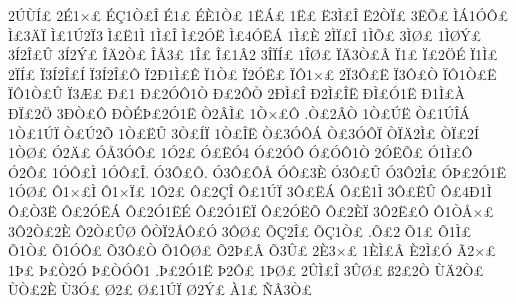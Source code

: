 {2^^da^^d9^^cd^^a3
2^^c91^^d7^^a3
^^c9^^c71^^d2^^a3^^ce
^^c91^^a3
^^c9^^c81^^d2^^a3
1^^cb^^c1^^a3
1^^cb^^a3
^^cb3^^cc^^a3^^ce
^^cb2^^d2^^cf^^a3
3^^cb^^d5^^a3
^^cc^^c11^^d3^^d4^^a3
^^cc^^a33^^c4^^cf
^^cc^^a31^^da2^^cf3
^^cc^^a3^^cb1^^cc
1^^cc^^a3^^ce
^^cc^^a32^^d3^^cb
^^cc^^a34^^d3^^cb^^c1
1^^cc^^a3^^c8
2^^cc^^cf^^a3^^ce
1^^cc^^d5^^a3
3^^cc^^d8^^a3
1^^cc^^d8^^dd^^a3
3^^cd2^^ce^^a3^^db
3^^cd2^^dd^^a3
^^ce^^c42^^d2^^a3
^^ce^^c53^^a3
1^^ce^^a3
^^ce^^a31^^c22
3^^ce^^cf^^cd^^a3
1^^ce^^d8^^a3
^^cf^^c43^^d2^^a3^^c2
^^cf1^^a3
^^cf^^a32^^d6^^c9
^^cf1^^cc^^a3
2^^cf^^cd^^a3
^^cf3^^cd2^^ce^^a3^^cd
^^cf3^^cd2^^ce^^a3^^d4
^^cf2^^d01^^cc^^a3^^ca
^^cf1^^d2^^a3
^^cf2^^d3^^cb^^a3
^^cf^^d41^^d7^^a3
2^^cf3^^d4^^a3^^cb
^^cf3^^d4^^a3^^d2
^^cf^^d41^^d2^^a3^^cb
^^cf^^d41^^d2^^a3^^db
^^cf3^^c6^^a3
^^d0^^a31
^^d0^^a32^^d3^^d41^^d2
^^d0^^a32^^d4^^d2
2^^d0^^cc^^a3^^ce
^^d02^^cc^^a3^^ce^^cb
^^d0^^cc^^a3^^d31^^cb
^^d01^^cc^^a3^^c0
^^d0^^cf^^a32^^d6
3^^d0^^d2^^a3^^d4
^^d0^^d2^^c9^^de^^a32^^d31^^cb
^^d22^^c2^^cc^^a3
1^^d2^^d7^^a3^^d4
.^^d2^^a32^^c2^^d2
1^^d2^^a3^^da^^cb
^^d2^^a31^^da^^ce^^c1
1^^d2^^a31^^da^^cf
^^d2^^a3^^da2^^d5
1^^d2^^a3^^cb^^db
3^^d2^^a3^^cd^^cf
1^^d2^^a3^^ce^^cb
^^d2^^a33^^d3^^d4^^c1
^^d2^^a33^^d3^^d4^^cf
^^d2^^cf^^c42^^cc^^a3
^^d2^^cf^^a32^^cd
1^^d2^^d8^^a3
^^d32^^c4^^a3
^^d3^^c53^^d3^^d4^^a3
1^^d32^^a3
^^d3^^a3^^cb^^d34
^^d3^^a32^^d3^^d4
^^d3^^a3^^d3^^d41^^d2
2^^d3^^cb^^d5^^a3
^^d31^^cc^^a3^^d4
^^d32^^d4^^a3
1^^d3^^d4^^a3^^cc
1^^d3^^d4^^a3^^ce.
^^d33^^d4^^a3^^d4.
^^d33^^d4^^a3^^d4^^c5
^^d3^^d4^^a33^^c8
^^d33^^d4^^a3^^db
^^d33^^d42^^cc^^a3
^^d3^^de^^a32^^d31^^cb
1^^d3^^d8^^a3
^^d41^^d7^^a3^^cc
^^d41^^d7^^cf^^a3
1^^d42^^a3
^^d4^^a32^^c7^^ce
^^d4^^a31^^da^^cf
3^^d4^^a3^^cb^^c1
^^d4^^a3^^cb1^^cc
3^^d4^^a3^^cb^^db
^^d4^^a34^^d01^^cc
^^d4^^a3^^d23^^cb
^^d4^^a32^^d3^^cb^^c1
^^d4^^a32^^d31^^cb^^c9
^^d4^^a32^^d31^^cb^^cf
^^d4^^a32^^d3^^cb^^d5
^^d4^^a32^^c8^^cf
3^^d42^^cb^^a3^^d4
^^d41^^d2^^c5^^d7^^a3
3^^d42^^d2^^a32^^c8
^^d42^^d2^^a3^^db^^d8
^^d4^^d2^^cf2^^c5^^d4^^a3^^d3
3^^d4^^d8^^a3
^^d5^^c72^^ce^^a3
^^d5^^c71^^d2^^a3
.^^d5^^a32
^^d51^^a3
^^d51^^cc^^a3
^^d51^^d2^^a3
^^d51^^d3^^d4^^a3
^^d53^^d4^^a3^^d2
^^d51^^d4^^d8^^a3
^^d52^^de^^a3^^c2
^^d53^^db^^a3
2^^c83^^d7^^a3
1^^c8^^cc^^a3^^c2
^^c82^^cc^^a3^^d3
^^c32^^d7^^a3
1^^de^^a3
^^de^^a3^^d22^^d3
^^de^^a3^^d2^^d3^^d41
.^^de^^a32^^d31^^cb
^^de2^^d4^^a3
1^^de^^d8^^a3
2^^db^^cc^^a3^^ce
3^^db^^d8^^a3
^^df2^^a32^^d2
^^d9^^c42^^d2^^a3
^^d9^^d2^^a32^^c8
^^d93^^d3^^a3
^^d82^^a3
^^d8^^a31^^da^^cf
^^d82^^dd^^a3
^^c01^^a3
^^d1^^c23^^d2^^a3
}
